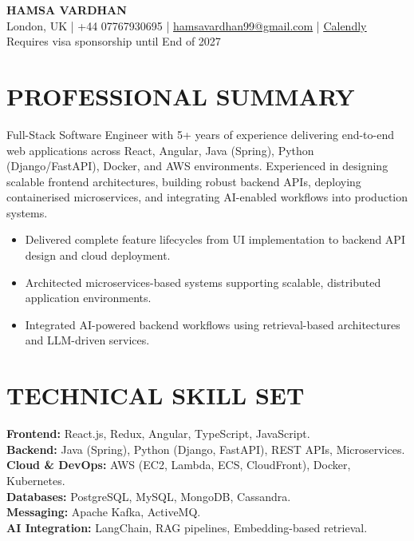 \documentclass[11pt]{article}
\begin{document}
\begin{center}
{\LARGE \textbf{HAMSA VARDHAN}}\\
London, UK \;|\; +44 07767930695 \;|\;
\href{mailto:hamsavardhan99@gmail.com}{hamsavardhan99@gmail.com} \;|\; \href{https://calendly.com/hamsa-vd/intro-call}{\underline{Calendly}} \\
{\small Requires visa sponsorship until End of 2027}
\end{center}

\section*{PROFESSIONAL SUMMARY}

Full-Stack Software Engineer with 5+ years of experience delivering end-to-end web applications across React, Angular, Java (Spring), Python (Django/FastAPI), Docker, and AWS environments. Experienced in designing scalable frontend architectures, building robust backend APIs, deploying containerised microservices, and integrating AI-enabled workflows into production systems.

\begin{itemize}
    \item Delivered complete feature lifecycles from UI implementation to backend API design and cloud deployment.
    \item Architected microservices-based systems supporting scalable, distributed application environments.
    \item Integrated AI-powered backend workflows using retrieval-based architectures and LLM-driven services.
\end{itemize}

\section*{TECHNICAL SKILL SET}

\textbf{Frontend:} React.js, Redux, Angular, TypeScript, JavaScript.\\
\textbf{Backend:} Java (Spring), Python (Django, FastAPI), REST APIs, Microservices.\\
\textbf{Cloud \& DevOps:} AWS (EC2, Lambda, ECS, CloudFront), Docker, Kubernetes.\\
\textbf{Databases:} PostgreSQL, MySQL, MongoDB, Cassandra.\\
\textbf{Messaging:} Apache Kafka, ActiveMQ.\\
\textbf{AI Integration:} LangChain, RAG pipelines, Embedding-based retrieval.
\end{document}

